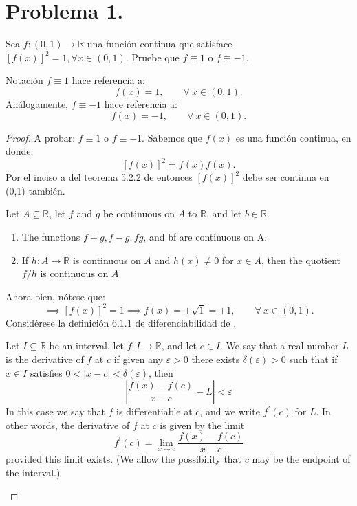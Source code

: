 \section{Problema 1.} Sea $f:(0,1) \rightarrow \mathbb{R}$ una función continua que satisface $[f(x)]^{2}=1, \forall x \in(0,1)$. Pruebe
que $f \equiv 1$ o $f \equiv-1$.
\begin{noter}{Notación}
$f \equiv 1$ hace referencia a:
$$f(x)=1, \qquad \forall \ x\in(0,1).$$
Análogamente, $f \equiv -1$ hace referencia a:
$$f(x)=-1, \qquad \forall \ x\in(0,1).$$
\end{noter}
\begin{proof}
A probar: $f\equiv 1$ o $f\equiv-1$. Sabemos que $f(x)$ es una función continua, en donde, 
$$[f(x)]^2=f(x)f(x).$$
Por el inciso a del teorema 5.2.2 de \cite{rudin1976principles} entonces $[f(x)]^2$ debe ser continua en (0,1) también. 
\begin{tcolorbox}[colback=gray!15,colframe=gray!1!gray,title=Teorema 5.2.2 de \cite{bartle2000introduction}]
Let $A \subseteq \mathbb{R}$, let $f$ and $g$ be continuous on $A$ to $\mathbb{R}$, and let $b \in \mathbb{R}$.
\begin{enumerate}
    \item The functions $f+g, f-g, f g$, and bf are continuous on A.
    \item If $h: A \rightarrow \mathbb{R}$ is continuous on $A$ and $h(x) \neq 0$ for $x \in A$, then the quotient $f / h$ is continuous on $A$.
\end{enumerate}
\end{tcolorbox}
Ahora bien, nótese que:
$$\implies [f(x)]^2=1 \implies f(x)= \pm \sqrt{1} = \pm 1, \qquad \forall \ x\in(0,1).$$
Considérese la definición 6.1.1 de diferenciabilidad de \cite{bartle2000introduction}. 
\begin{tcolorbox}[colback=blue!15,colframe=blue!1!blue,title=Definición 6.1.1. de \cite{bartle2000introduction}]
Let $I \subseteq \mathbb{R}$ be an interval, let $f: I \rightarrow \mathbb{R}$, and let $c \in I$. We say that a real number $L$ is the derivative of $f$ at $c$ if given any $\varepsilon>0$ there exists $\delta(\varepsilon)>0$ such that if $x \in I$ satisfies $0<|x-c|<\delta(\varepsilon)$, then
$$
\left|\frac{f(x)-f(c)}{x-c}-L\right|<\varepsilon
$$
In this case we say that $f$ is differentiable at $c$, and we write $f^{\prime}(c)$ for $L$. In other words, the derivative of $f$ at $c$ is given by the limit
$$
f^{\prime}(c)=\lim _{x \rightarrow c} \frac{f(x)-f(c)}{x-c}
$$
provided this limit exists. (We allow the possibility that $c$ may be the endpoint of the interval.)
\end{tcolorbox}


\end{proof}
